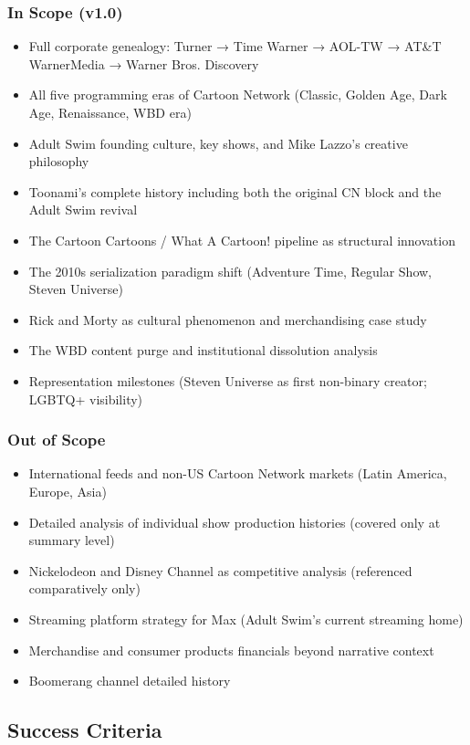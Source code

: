 \documentclass[11pt,letterpaper]{article}
\begin{document}
\subsubsection{In Scope (v1.0)}
\begin{itemize}
  \item Full corporate genealogy: Turner → Time Warner → AOL-TW → AT\&T WarnerMedia → Warner Bros. Discovery
  \item All five programming eras of Cartoon Network (Classic, Golden Age, Dark Age, Renaissance, WBD era)
  \item Adult Swim founding culture, key shows, and Mike Lazzo's creative philosophy
  \item Toonami's complete history including both the original CN block and the Adult Swim revival
  \item The Cartoon Cartoons / What A Cartoon! pipeline as structural innovation
  \item The 2010s serialization paradigm shift (Adventure Time, Regular Show, Steven Universe)
  \item Rick and Morty as cultural phenomenon and merchandising case study
  \item The WBD content purge and institutional dissolution analysis
  \item Representation milestones (Steven Universe as first non-binary creator; LGBTQ+ visibility)
\end{itemize}

\subsubsection{Out of Scope}
\begin{itemize}
  \item International feeds and non-US Cartoon Network markets (Latin America, Europe, Asia)
  \item Detailed analysis of individual show production histories (covered only at summary level)
  \item Nickelodeon and Disney Channel as competitive analysis (referenced comparatively only)
  \item Streaming platform strategy for Max (Adult Swim's current streaming home)
  \item Merchandise and consumer products financials beyond narrative context
  \item Boomerang channel detailed history
\end{itemize}

\subsection{Success Criteria}
\end{document}
